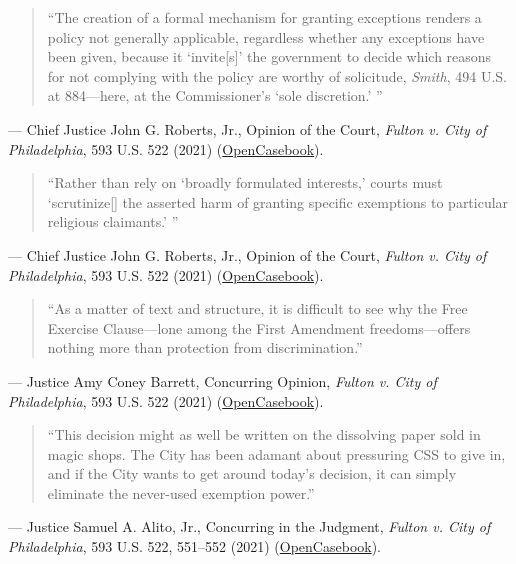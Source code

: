 \documentclass[12pt]{article}
\begin{document}
\begin{quote}
``The creation of a formal mechanism for granting exceptions renders a policy not generally applicable, regardless whether any exceptions have been given, because it `invite[s]' the government to decide which reasons for not complying with the policy are worthy of solicitude, \textit{Smith}, 494 U.S. at 884---here, at the Commissioner's `sole discretion.' ''
\end{quote}
\noindent --- Chief Justice John G. Roberts, Jr., Opinion of the Court, \textit{Fulton v. City of Philadelphia}, 593 U.S. 522 (2021) (\href{https://opencasebook.org/casebooks/4501-constitutional-law/resources/12.9-fulton-v-city-of-philadelphia-2020/}{OpenCasebook}).

\begin{quote}
``Rather than rely on `broadly formulated interests,' courts must `scrutinize[] the asserted harm of granting specific exemptions to particular religious claimants.' ''
\end{quote}
\noindent --- Chief Justice John G. Roberts, Jr., Opinion of the Court, \textit{Fulton v. City of Philadelphia}, 593 U.S. 522 (2021) (\href{https://opencasebook.org/casebooks/4501-constitutional-law/resources/12.9-fulton-v-city-of-philadelphia-2020/}{OpenCasebook}).

\begin{quote}
``As a matter of text and structure, it is difficult to see why the Free Exercise Clause---lone among the First Amendment freedoms---offers nothing more than protection from discrimination.''
\end{quote}
\noindent --- Justice Amy Coney Barrett, Concurring Opinion, \textit{Fulton v. City of Philadelphia}, 593 U.S. 522 (2021) (\href{https://opencasebook.org/casebooks/4501-constitutional-law/resources/12.9-fulton-v-city-of-philadelphia-2020/}{OpenCasebook}).

\begin{quote}
``This decision might as well be written on the dissolving paper sold in magic shops. The City has been adamant about pressuring CSS to give in, and if the City wants to get around today's decision, it can simply eliminate the never-used exemption power.''
\end{quote}
\noindent --- Justice Samuel A. Alito, Jr., Concurring in the Judgment, \textit{Fulton v. City of Philadelphia}, 593 U.S. 522, 551--552 (2021) (\href{https://opencasebook.org/casebooks/4501-constitutional-law/resources/12.9-fulton-v-city-of-philadelphia-2020/}{OpenCasebook}).
\end{document}
